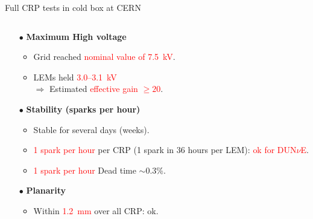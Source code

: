 \documentclass[10pt]{beamer}
\begin{document}
\begin{frame}{Full CRP tests in cold box at CERN}
\begin{columns}
\begin{column}{0.6\textwidth}
\begin{scriptsize}
	    			\begin{itemize}
	    				\item[$\bullet$] \textbf{Maximum High voltage}
	    				\begin{itemize}
	    					\item Grid reached \textcolor{red}{nominal value of \SI{7.5}{\kilo\volt}}.
	    					\item LEMs held \textcolor{red}{3.0--\SI{3.1}{\kilo\volt}}\\
				    					$\Rightarrow$ Estimated \textcolor{red}{effective gain $\geq 20$}.
	    				\end{itemize}
	    				\item[$\bullet$] \textbf{Stability (sparks per hour)}
	    				\begin{itemize}
	    					\item Stable for several days (weeks).
	    					\item \textcolor{red}{1 spark per hour} per CRP (1 spark in 36 hours per LEM): \textcolor{red}{ok for DUN$\nu$E}.
	    					\item \textcolor{red}{1 spark per hour} Dead time $\sim$0.3\%.
	    				\end{itemize}
	    				\item[$\bullet$] \textbf{Planarity}
	    				\begin{itemize}
	    					\item Within \textcolor{red}{\SI{1.2}{\milli\meter}} over all CRP: ok.
	    				\end{itemize}
	    			\end{itemize}
	    		\end{scriptsize}
    		\end{column}
    	\end{columns}
	    \end{frame}
       
\end{document}
